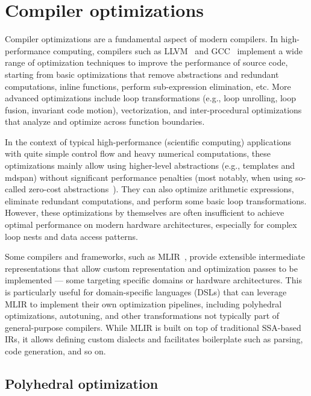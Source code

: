 \section{Compiler optimizations}\label{sec:compiler-optimizations}

Compiler optimizations are a fundamental aspect of modern compilers. In high-performance computing, compilers such as LLVM~\cite{lattner2004llvm} and GCC~\cite{gcc} implement a wide range of optimization techniques to improve the performance of source code, starting from basic optimizations that remove abstractions and redundant computations, inline functions, perform sub-expression elimination, etc. More advanced optimizations include loop transformations (e.g., loop unrolling, loop fusion, invariant code motion), vectorization, and inter-procedural optimizations that analyze and optimize across function boundaries.

In the context of typical high-performance (scientific computing) applications with quite simple control flow and heavy numerical computations, these optimizations mainly allow using higher-level abstractions (e.g., \cpp templates and mdspan) without significant performance penalties (most notably, when using so-called zero-cost abstractions~\cite{stroustrup2012foundations}). They can also optimize arithmetic expressions, eliminate redundant computations, and perform some basic loop transformations. However, these optimizations by themselves are often insufficient to achieve optimal performance on modern hardware architectures, especially for complex loop nests and data access patterns.

Some compilers and frameworks, such as MLIR~\cite{lattner2021mlir}, provide extensible intermediate representations that allow custom representation and optimization passes to be implemented --- some targeting specific domains or hardware architectures. This is particularly useful for domain-specific languages (DSLs) that can leverage MLIR to implement their own optimization pipelines, including polyhedral optimizations, autotuning, and other transformations not typically part of general-purpose compilers. While MLIR is built on top of traditional SSA-based IRs, it allows defining custom dialects and facilitates boilerplate such as parsing, code generation, and so on.


\subsection{Polyhedral optimization}\label{sec:polyhedral-optimization}


